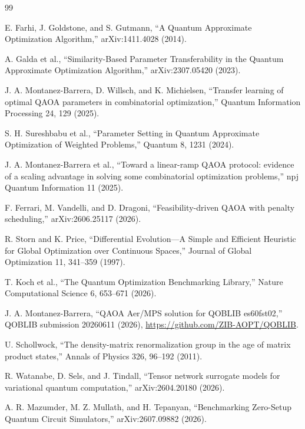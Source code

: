 \documentclass[10pt,twocolumn]{article}
\begin{document}
\begin{thebibliography}{99}
\scriptsize
\setlength{\itemsep}{-1.5pt}
\setlength{\parsep}{0pt}

E. Farhi, J. Goldstone, and S. Gutmann,
``A Quantum Approximate Optimization Algorithm,'' arXiv:1411.4028 (2014).

A. Galda et al., ``Similarity-Based Parameter Transferability in the Quantum
Approximate Optimization Algorithm,'' arXiv:2307.05420 (2023).

J. A. Montanez-Barrera, D. Willsch, and K. Michielsen,
``Transfer learning of optimal QAOA parameters in combinatorial optimization,''
Quantum Information Processing 24, 129 (2025).

S. H. Sureshbabu et al., ``Parameter Setting in Quantum Approximate
Optimization of Weighted Problems,'' Quantum 8, 1231 (2024).

J. A. Montanez-Barrera et al., ``Toward a linear-ramp QAOA protocol: evidence
of a scaling advantage in solving some combinatorial optimization problems,''
npj Quantum Information 11 (2025).

F. Ferrari, M. Vandelli, and D. Dragoni, ``Feasibility-driven QAOA with penalty
scheduling,'' arXiv:2606.25117 (2026).

R. Storn and K. Price, ``Differential Evolution---A Simple and Efficient
Heuristic for Global Optimization over Continuous Spaces,'' Journal of Global
Optimization 11, 341--359 (1997).

T. Koch et al., ``The Quantum Optimization Benchmarking Library,'' Nature
Computational Science 6, 653--671 (2026).

J. A. Montanez-Barrera, ``QAOA Aer/MPS solution for QOBLIB es60fst02,'' QOBLIB
submission 20260611 (2026), \url{https://github.com/ZIB-AOPT/QOBLIB}.

U. Schollwock, ``The density-matrix renormalization group in the age of matrix
product states,'' Annals of Physics 326, 96--192 (2011).

R. Watanabe, D. Sels, and J. Tindall, ``Tensor network surrogate models for
variational quantum computation,'' arXiv:2604.20180 (2026).

A. R. Mazumder, M. Z. Mullath, and H. Tepanyan, ``Benchmarking Zero-Setup
Quantum Circuit Simulators,'' arXiv:2607.09882 (2026).


\end{thebibliography}
\end{document}
